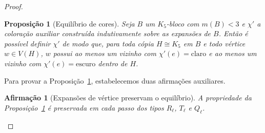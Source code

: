 \documentclass[reqno, 12pt]{amsart}
\numberwithin{equation}{section}
\theoremstyle{plain}
\newtheorem{proposition}[theorem]{Proposição}
\newtheorem{afirmacao}[theorem]{Afirmação}
\theoremstyle{definition}
\newcommand{\maxdens}{m}
\begin{document}
\begin{proof}
\medskip
\begin{center}
\end{center}
\medskip


\begin{proposition}[Equilíbrio de cores]
\label{prop:equilibrio}
Seja $B$ um $K_5$-bloco com $\maxdens(B) < 3$ e $\chi'$ a coloração auxiliar construída
indutivamente sobre as expansões de $B$. Então é possível definir $\chi'$ de modo que,
para toda cópia $H \cong K_5$ em $B$ e todo vértice $w \in V(H)$, $w$ possui ao menos
um vizinho com $\chi'(e) = \text{claro}$ e ao menos um vizinho com $\chi'(e) = \text{escuro}$
dentro de $H$.
\end{proposition}

\noindent
Para provar a Proposição~\ref{prop:equilibrio}, estabelecemos duas afirmações auxiliares.

\begin{afirmacao}[Expansões de vértice preservam o equilíbrio]
\label{afirm:vertex-exp}
A propriedade da Proposição~\ref{prop:equilibrio} é preservada em cada passo dos tipos
$R_\ell$, $T_\ell$ e $Q_\ell$.
\end{afirmacao}


\end{proof}
\end{document}
